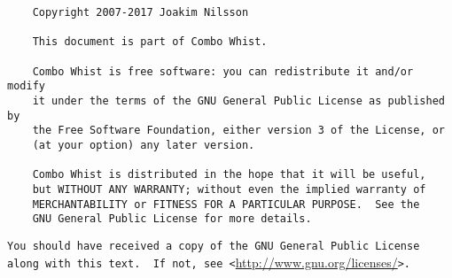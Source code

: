 %
%
%
%
%

\begin{verbatim}
	Copyright 2007-2017 Joakim Nilsson

	This document is part of Combo Whist.

	Combo Whist is free software: you can redistribute it and/or modify
	it under the terms of the GNU General Public License as published by
	the Free Software Foundation, either version 3 of the License, or
	(at your option) any later version.

	Combo Whist is distributed in the hope that it will be useful,
	but WITHOUT ANY WARRANTY; without even the implied warranty of
	MERCHANTABILITY or FITNESS FOR A PARTICULAR PURPOSE.  See the
	GNU General Public License for more details.
\end{verbatim}
\verb|You should have received a copy of the GNU General Public License|\\
\verb|along with this text.  If not, see <|\url{http://www.gnu.org/licenses/}\verb|>.|
